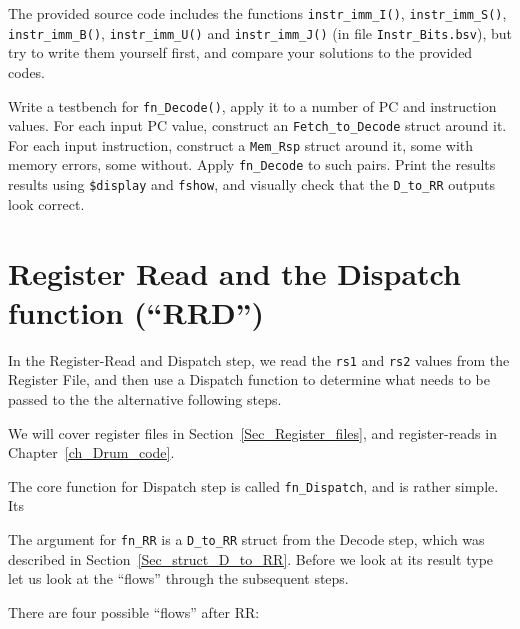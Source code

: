\hdivider

\Exercise

The provided source code includes the functions \verb|instr_imm_I()|,
\verb|instr_imm_S()|, \verb|instr_imm_B()|, \verb|instr_imm_U()| and
\verb|instr_imm_J()| (in file \verb|Instr_Bits.bsv|), but try to write
them yourself first, and compare your solutions to the provided codes.

\Exercise

Write a testbench for \verb|fn_Decode()|, apply it to a number of PC
and instruction values.  For each input PC value, construct an
\verb|Fetch_to_Decode| struct around it.  For each input instruction,
construct a \verb|Mem_Rsp| struct around it, some with memory errors,
some without.  Apply \verb|fn_Decode| to such pairs.  Print the
results results using \verb|$display| and \verb|fshow|, and visually
check that the \verb|D_to_RR| outputs look correct.

\Endexercise


\section{Register Read and the Dispatch function (``RRD'')}

\label{Sec_RRD_function}



In the Register-Read and Dispatch step, we read the \verb|rs1| and
\verb|rs2| values from the Register File, and then use a Dispatch
function to determine what needs to be passed to the the alternative
following steps.

We will cover register files in Section~\ref{Sec_Register_files},
and register-reads in Chapter~\ref{ch_Drum_code}.

The core function for Dispatch step is called \verb|fn_Dispatch|, and
is rather simple.  Its

The argument for \verb|fn_RR| is a \verb|D_to_RR| struct from the
Decode step, which was described in Section~\ref{Sec_struct_D_to_RR}.
Before we look at its result type let us look at the ``flows'' through
the subsequent steps.

There are four possible ``flows'' after RR:

